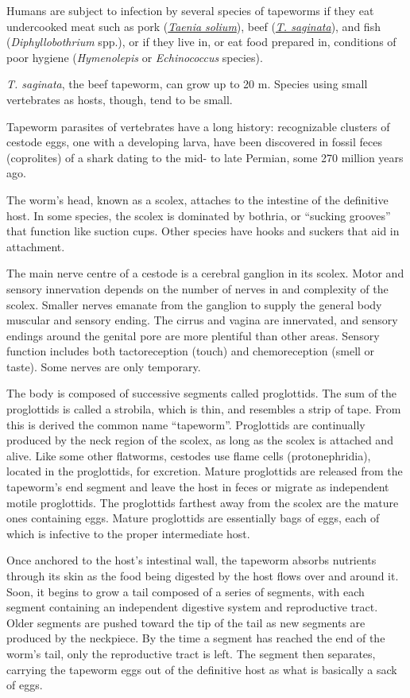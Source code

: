 Humans are subject to infection by several species of tapeworms if they
eat undercooked meat such as pork
(\href{https://en.wikipedia.org/wiki/Taenia_solium}{\emph{Taenia
solium}}), beef
(\href{https://en.wikipedia.org/wiki/Taenia_saginata}{\emph{T.
saginata}}), and fish (\emph{Diphyllobothrium} spp.), or if they live
in, or eat food prepared in, conditions of poor hygiene
(\emph{Hymenolepis} or \emph{Echinococcus} species).

\emph{T. saginata}, the beef tapeworm, can grow up to 20 m. Species
using small vertebrates as hosts, though, tend to be small.

Tapeworm parasites of vertebrates have a long history: recognizable
clusters of cestode eggs, one with a developing larva, have been
discovered in fossil feces (coprolites) of a shark dating to the mid- to
late Permian, some 270 million years ago.

The worm's head, known as a scolex, attaches to the intestine of the
definitive host. In some species, the scolex is dominated by bothria, or
``sucking grooves'' that function like suction cups. Other species have
hooks and suckers that aid in attachment.

The main nerve centre of a cestode is a cerebral ganglion in its scolex.
Motor and sensory innervation depends on the number of nerves in and
complexity of the scolex. Smaller nerves emanate from the ganglion to
supply the general body muscular and sensory ending. The cirrus and
vagina are innervated, and sensory endings around the genital pore are
more plentiful than other areas. Sensory function includes both
tactoreception (touch) and chemoreception (smell or taste). Some nerves
are only temporary.

The body is composed of successive segments called proglottids. The sum
of the proglottids is called a strobila, which is thin, and resembles a
strip of tape. From this is derived the common name ``tapeworm''.
Proglottids are continually produced by the neck region of the scolex,
as long as the scolex is attached and alive. Like some other flatworms,
cestodes use flame cells (protonephridia), located in the proglottids,
for excretion. Mature proglottids are released from the tapeworm's end
segment and leave the host in feces or migrate as independent motile
proglottids. The proglottids farthest away from the scolex are the
mature ones containing eggs. Mature proglottids are essentially bags of
eggs, each of which is infective to the proper intermediate host.

Once anchored to the host's intestinal wall, the tapeworm absorbs
nutrients through its skin as the food being digested by the host flows
over and around it. Soon, it begins to grow a tail composed of a series
of segments, with each segment containing an independent digestive
system and reproductive tract. Older segments are pushed toward the tip
of the tail as new segments are produced by the neckpiece. By the time a
segment has reached the end of the worm's tail, only the reproductive
tract is left. The segment then separates, carrying the tapeworm eggs
out of the definitive host as what is basically a sack of eggs.

